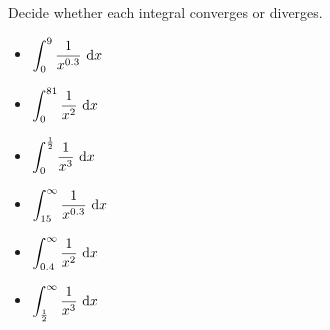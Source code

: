 \begin{frame}
Decide whether each integral converges or diverges.\vfill
\begin{multicols}{2}
\begin{itemize}
\item $\displaystyle\int_0^{9} \frac{1}{x^{0.3}}\ \text{d} x$ 
\item $\displaystyle\int_0^{81} \frac{1}{x^2}\ \text{d} x$ 
\item $\displaystyle\int_0^{\frac12} \frac{1}{x^3}\ \text{d} x$ 
\columnbreak
\item $\displaystyle\int_{15}^{\infty} \frac{1}{x^{0.3}}\ \text{d} x$ 
\item $\displaystyle\int_{0.4}^{\infty} \frac{1}{x^2}\ \text{d} x$ 
\item $\displaystyle\int_{\frac12}^{\infty} \frac{1}{x^3}\ \text{d} x$ 
\end{itemize}
\end{multicols}
\end{frame}

